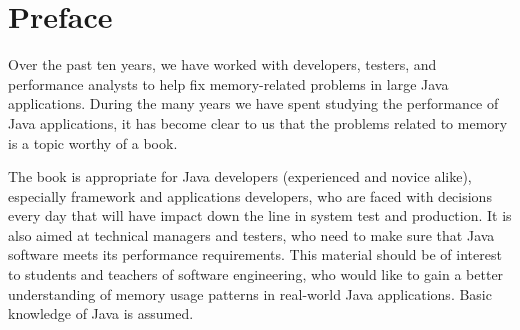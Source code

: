 \chapter{Preface}

Over the past ten years, we have worked with developers, testers, and performance analysts to help fix memory-related problems in large Java applications.
During the many years we have spent studying the performance of Java applications, it has become clear to us that the problems related to memory is a topic worthy of a book.

The book is appropriate for Java developers (experienced and novice alike), especially framework and applications developers, who are faced with decisions every day that will have impact down the line in system test and production. It is also aimed at technical managers and testers, who need to make sure that Java software meets its performance requirements.  This material should be of interest to students and teachers of software engineering, who would like to gain a better understanding of memory usage patterns in real-world Java applications. Basic knowledge of Java is assumed.

